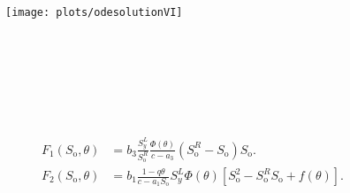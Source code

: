 \documentclass[
    8pt,
    aspectratio=1610,
    c,
    intlimits,
    leqno,
    professionalfonts,
]{beamer}
\begin{document}
\begin{frame}[fragile]
	\frametitle{\secname}

	\begin{figure}[ht!]
		\centering
		\texttt{[image: plots/odesolutionVI]}
		\caption{}
	\end{figure}
\end{frame}

\begin{frame}[fragile]
	\frametitle{\secname}

	\begin{columns}
		\begin{column}{0.43\textwidth}
			\inputminted[fontsize=\tiny,firstline=5,lastline=35]{python}{main.py}
			\inputminted[fontsize=\tiny,firstline=45,lastline=56]{python}{main.py}
		\end{column}
		\begin{column}{0.53\textwidth}
			\inputminted[fontsize=\tiny,firstline=1,lastline=27]{text}{main.txt}
		\end{column}
	\end{columns}
\end{frame}

\begin{frame}[fragile]
	\frametitle{\secname}

	\begin{columns}
		\begin{column}{0.43\textwidth}
			\inputminted[fontsize=\tiny,firstline=67,lastline=107]{python}{main.py}
		\end{column}
		\begin{column}{0.53\textwidth}
			\inputminted[fontsize=\tiny,firstline=29,lastline=63]{text}{main.txt}
		\end{column}
	\end{columns}
\end{frame}

\begin{frame}
	\begin{align*}
		F_{1}\left(S_{\text{o}},\theta\right) & =
		b_{3}
		\frac{S^{L}_{y}}{S^{R}_{\text{o}}}
		\frac{\Phi\left(\theta\right)}{c-a_{3}}\left(S^{R}_{\text{o}}-S_{\text{o}}\right)S_{\text{o}}. \\
		F_{2}\left(S_{\text{o}},\theta\right) & =
		b_{1}\frac{1-q\theta}{c-a_{1}S_{\text{o}}}
		S^{L}_{y}\Phi\left(\theta\right)
		\left[S^{2}_{\text{o}}-S^{R}_{\text{o}}S_{\text{o}}+f\left(\theta\right)\right].
	\end{align*}
\end{frame}
\end{document}
